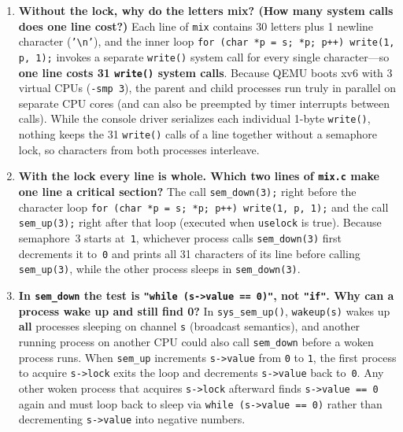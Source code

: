 \documentclass{../latex/utmreport}
\providecommand{\tightlist}{\setlength{\itemsep}{0pt}\setlength{\parskip}{0pt}}
\begin{document}
\begin{enumerate}
\tightlist
\item \textbf{Without the lock, why do the letters mix? (How many system calls does one line cost?)}
Each line of \texttt{mix} contains 30 letters plus 1 newline character (\texttt{'\textbackslash n'}), and the inner loop \texttt{for (char *p = s; *p; p++) write(1, p, 1);} invokes a separate \texttt{write()} system call for every single character—so \textbf{one line costs 31 \texttt{write()} system calls}. Because QEMU boots xv6 with 3 virtual CPUs (\texttt{-smp 3}), the parent and child processes run truly in parallel on separate CPU cores (and can also be preempted by timer interrupts between calls). While the console driver serializes each individual 1-byte \texttt{write()}, nothing keeps the 31 \texttt{write()} calls of a line together without a semaphore lock, so characters from both processes interleave.

\item \textbf{With the lock every line is whole. Which two lines of \texttt{mix.c} make one line a critical section?}
The call \texttt{sem\_down(3);} right before the character loop \texttt{for (char *p = s; *p; p++) write(1, p, 1);} and the call \texttt{sem\_up(3);} right after that loop (executed when \texttt{uselock} is true). Because semaphore~3 starts at~\texttt{1}, whichever process calls \texttt{sem\_down(3)} first decrements it to~\texttt{0} and prints all 31 characters of its line before calling \texttt{sem\_up(3)}, while the other process sleeps in \texttt{sem\_down(3)}.

\item \textbf{In \texttt{sem\_down} the test is \texttt{"while (s->value == 0)"}, not \texttt{"if"}. Why can a process wake up and still find 0?}
In \texttt{sys\_sem\_up()}, \texttt{wakeup(s)} wakes up \textbf{all} processes sleeping on channel \texttt{s} (broadcast semantics), and another running process on another CPU could also call \texttt{sem\_down} before a woken process runs. When \texttt{sem\_up} increments \texttt{s->value} from \texttt{0} to \texttt{1}, the first process to acquire \texttt{s->lock} exits the loop and decrements \texttt{s->value} back to~\texttt{0}. Any other woken process that acquires \texttt{s->lock} afterward finds \texttt{s->value == 0} again and must loop back to sleep via \texttt{while (s->value == 0)} rather than decrementing \texttt{s->value} into negative numbers.


\end{enumerate}
\end{document}
